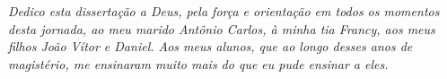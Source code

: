 
\begin{dedicatoria}
	\vspace*{\fill}
	\centering
	\noindent
	\begin{flushright}
		\begin{minipage}{10cm}
			\emph{Dedico esta dissertação a Deus, pela força e orientação em todos os momentos desta jornada, ao meu marido Antônio Carlos, à minha tia Francy, aos meus filhos João Vítor e Daniel.
				Aos meus alunos, que ao longo desses anos de magistério, me ensinaram muito mais do que eu pude ensinar a eles.}
		\end{minipage}
	\end{flushright}
	\vspace{3cm}
\end{dedicatoria}
